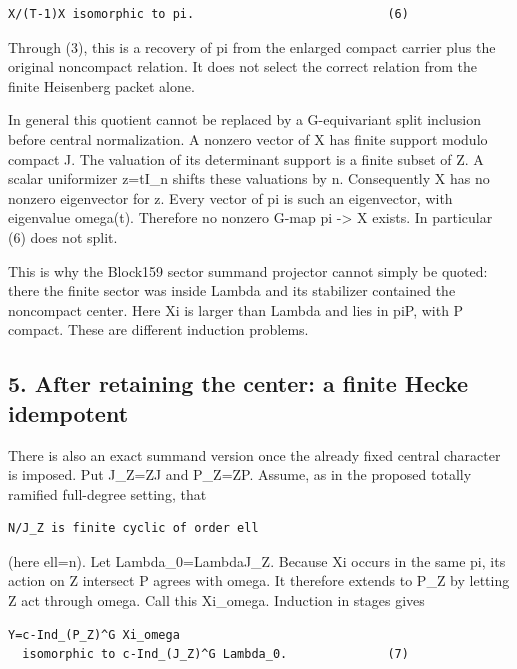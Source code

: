 \begin{Verbatim}[fontsize=\small,breaklines=true,breakanywhere=true]
X/(T-1)X isomorphic to pi.                           (6)
\end{Verbatim}

Through (3), this is a recovery of pi from the enlarged compact carrier
plus the original noncompact relation. It does not select the correct
relation from the finite Heisenberg packet alone.

In general this quotient cannot be replaced by a G-equivariant split
inclusion before central normalization. A nonzero vector of X has finite
support modulo compact J. The valuation of its determinant support is a
finite subset of Z. A scalar uniformizer z=tI\_n shifts these valuations by n. Consequently X has no nonzero eigenvector for z. Every vector of
pi is such an eigenvector, with eigenvalue omega(t). Therefore no
nonzero G-map pi -\textgreater{} X exists. In particular (6) does not
split.

This is why the Block159 sector summand projector cannot simply be
quoted: there the finite sector was inside Lambda and its stabilizer
contained the noncompact center. Here Xi is larger than Lambda and lies
in pi\textbar P, with P compact. These are different induction problems.

\hypertarget{lowrank_contract-after-retaining-the-center-a-finite-hecke-idempotent}{%
\subsection{5. After retaining the center: a finite Hecke
idempotent}\label{lowrank_contract-after-retaining-the-center-a-finite-hecke-idempotent}}

There is also an exact summand version once the already fixed central
character is imposed. Put J\_Z=ZJ and P\_Z=ZP. Assume, as in the
proposed totally ramified full-degree setting, that

\begin{Verbatim}[fontsize=\small,breaklines=true,breakanywhere=true]
N/J_Z is finite cyclic of order ell
\end{Verbatim}

(here ell=n). Let Lambda\_0=Lambda\textbar J\_Z. Because Xi occurs in
the same pi, its action on Z intersect P agrees with omega. It therefore
extends to P\_Z by letting Z act through omega. Call this Xi\_omega.
Induction in stages gives

\begin{Verbatim}[fontsize=\small,breaklines=true,breakanywhere=true]
Y=c-Ind_(P_Z)^G Xi_omega
  isomorphic to c-Ind_(J_Z)^G Lambda_0.              (7)
\end{Verbatim}

